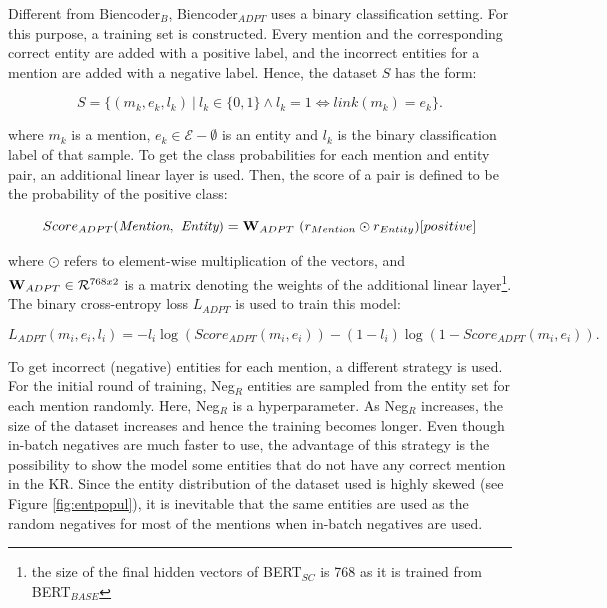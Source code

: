 \documentclass{report}
\theoremstyle{definition}
\theoremstyle{remark}
\begin{document}
Different from Biencoder$_{B}$, Biencoder$_{ADPT}$ uses a binary classification setting. For this purpose, a training set is constructed. Every mention and the corresponding correct entity are added with a positive label, and the incorrect entities for a mention are added with a negative label. Hence, the dataset $S$ has the form:

\begin{equation}
    S = \{ (m_k,e_k,l_k) \ | \ l_k \in \{0,1\} \land l_k=1 \iff link(m_k) = e_k \}.
\end{equation}

\noindent where $m_k$ is a mention, $e_k \in \mathcal{E}-\emptyset$ is an entity and $l_k$ is the binary classification label of that sample. To get the class probabilities for each mention and entity pair, an additional linear layer is used. Then, the score of a pair is defined to be the probability of the positive class:

\begin{equation}
    Score_{ADPT}(\textit{Mention},\textit{ Entity}) = \bold{W}_{ADPT} \ (r_{Mention} \odot r_{Entity}) [positive]
\end{equation}

\noindent where $\odot$ refers to element-wise multiplication of the vectors, and $\bold{W}_{ADPT} \in \mathcal{R}^{768x2}$ is a matrix denoting the weights of the additional linear layer\footnote{the size of the final hidden vectors of BERT$_{SC}$ is 768 as it is trained from BERT$_{BASE}$}. The binary cross-entropy loss $L_{ADPT}$ is used to train this model:

\begin{equation}
    L_{ADPT}(m_i,e_i,l_i) = - l_i \log (Score_{ADPT}(m_i,e_i)) - (1-l_i) \log (1-Score_{ADPT}(m_i,e_i)).
\end{equation}

To get incorrect (negative) entities for each mention, a different strategy is used. For the initial round of training, Neg$_{R}$ entities are sampled from the entity set for each mention randomly. Here, Neg$_{R}$ is a hyperparameter. As Neg$_{R}$ increases, the size of the dataset increases and hence the training becomes longer. Even though in-batch negatives are much faster to use, the advantage of this strategy is the possibility to show the model some entities that do not have any correct mention in the KR. Since the entity distribution of the dataset used is highly skewed (see Figure \ref{fig:entpopul}), it is inevitable that the same entities are used as the random negatives for most of the mentions when in-batch negatives are used.
\end{document}
